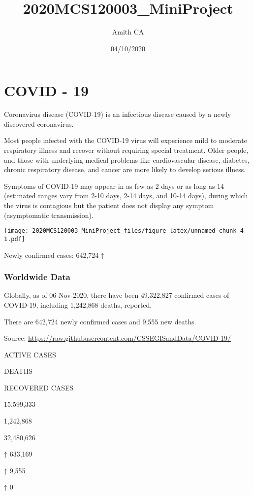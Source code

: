 \documentclass[
]{article}
\title{2020MCS120003\_MiniProject}
\author{Amith CA}
\date{04/10/2020}
\begin{document}
\maketitle

\hypertarget{covid---19}{%
\section{COVID - 19}\label{covid---19}}

Coronavirus disease (COVID-19) is an infectious disease caused by a
newly discovered coronavirus.

Most people infected with the COVID-19 virus will experience mild to
moderate respiratory illness and recover without requiring special
treatment. Older people, and those with underlying medical problems like
cardiovascular disease, diabetes, chronic respiratory disease, and
cancer are more likely to develop serious illness.

Symptoms of COVID-19 may appear in as few as 2 days or as long as 14
(estimated ranges vary from 2-10 days, 2-14 days, and 10-14 days),
during which the virus is contagious but the patient does not display
any symptom (asymptomatic transmission).

\texttt{[image: 2020MCS120003\_MiniProject\_files/figure-latex/unnamed-chunk-4-1.pdf]}

Newly confirmed cases: {642,724 ↑}

\hypertarget{worldwide-data}{%
\subsubsection{Worldwide Data}\label{worldwide-data}}

Globally, as of 06-Nov-2020, there have been {49,322,827} confirmed
cases of COVID-19, including {1,242,868 }deaths, reported.

There are { 642,724 } newly confirmed cases and {9,555 }new deaths.

Source: \url{https://raw.githubusercontent.com/CSSEGISandData/COVID-19/}

ACTIVE CASES

DEATHS

RECOVERED CASES

15,599,333

{1,242,868}

{32,480,626}

↑ 633,169

{↑ 9,555}

{↑ 0}
\end{document}
